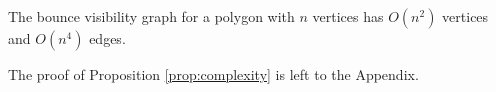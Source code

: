 \documentclass[]{styles/svproc}  %
\begin{document}
\begin{proposition} \label{prop:complexity}
The bounce visibility graph for a polygon with $n$ vertices has 
$O(n^2)$ vertices and $O(n^4)$ edges.
\end{proposition}

The proof of Proposition \ref{prop:complexity} is left to the Appendix.

%
%
\end{document}
